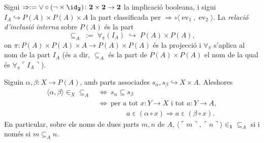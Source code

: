 \begin{definicio}\label{def:inclusio-interna}
Sigui \(\Rightarrow:=\vee\circ(\neg\times\id_{\mathbf2})\colon
\mathbf2\times\mathbf2\to\mathbf2\) la implicació booleana, i sigui
\(I_A\hookrightarrow P(A)\times P(A)\times A\) la part classificada per
\(\Rightarrow\circ\langle\operatorname{ev}_1,\operatorname{ev}_2\rangle\).
La \emph{relació d'inclusió interna} sobre \(P(A)\) és la part
\[
{\subseteq_A}\;:=\;\forall_\pi(I_A)\;\hookrightarrow\;P(A)\times P(A),
\]
on \(\pi\colon P(A)\times P(A)\times A\to P(A)\times P(A)\) és la
projecció i \(\forall_\pi\) s'aplica al nom de la part \(I_A\) (és a dir,
\(\subseteq_A\) és la part de \(P(A)\times P(A)\) el nom de la qual és
\(\forall_\pi\ulcorner I_A\urcorner\)).
\end{definicio}

\begin{proposicio}\label{prop:inclusio-interna-lectura}
Siguin \(\alpha,\beta\colon X\to P(A)\), amb parts associades
\(s_\alpha,s_\beta\hookrightarrow X\times A\). Aleshores
\[
\begin{aligned}
\langle\alpha,\beta\rangle\in_X{\subseteq_A}
\ &\Longleftrightarrow\
s_\alpha\subseteq s_\beta\\
&\Longleftrightarrow\
\text{per a tot } x\colon Y\to X \text{ i tot } a\colon Y\to A,\\
&\qquad\qquad
a\mathrel{\varepsilon}(\alpha\circ x)\Rightarrow a\mathrel{\varepsilon}(\beta\circ x).
\end{aligned}
\]
En particular, sobre els noms de dues parts \(m,n\) de \(A\),
\(\langle\ulcorner m\urcorner,\ulcorner n\urcorner\rangle\in_{\mathbf1}{\subseteq_A}\)
si i només si \(m\subseteq_A n\).
\end{proposicio}

